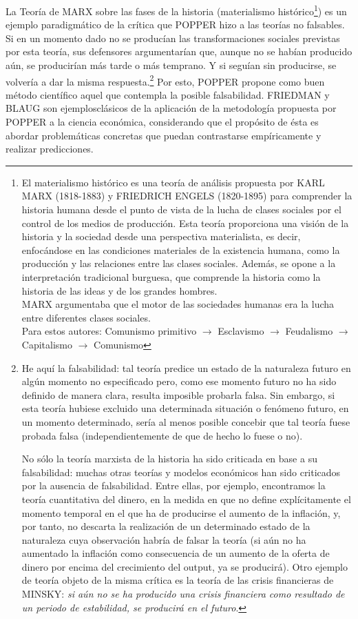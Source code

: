 \documentclass[10pt,a4paper]{article}
\begin{document}
La Teoría de MARX sobre las fases de la historia (materialismo histórico\footnote{%
    El materialismo histórico es una teoría de análisis propuesta por KARL MARX (1818-1883) y FRIEDRICH ENGELS (1820-1895) para comprender la historia humana desde el punto de vista de la lucha de clases sociales por el control de los medios de producción. Esta teoría proporciona una visión de la historia y la sociedad desde una perspectiva materialista, es decir, enfocándose en las condiciones materiales de la existencia humana, como la producción y las relaciones entre las clases sociales. Además, se opone a la interpretación tradicional burguesa, que comprende la historia como la historia de las ideas y de los grandes hombres.\\
MARX argumentaba que el motor de las sociedades humanas era la lucha entre diferentes clases sociales.\\
Para estos autores: Comunismo primitivo $\to$ Esclavismo $\to$ Feudalismo $\to$ Capitalismo $\to$ Comunismo
}) es un ejemplo paradigmático de la crítica que POPPER hizo a las teorías no falsables. Si en un momento dado no se producían las transformaciones sociales previstas por esta teoría, sus defensores argumentarían que, aunque no se habían producido aún, se producirían más tarde o más temprano. Y si seguían sin producirse, se volvería a dar la misma respuesta.\footnote{%
    He aquí la falsabilidad: tal teoría predice un estado de la naturaleza futuro en algún momento no especificado pero, como ese momento futuro no ha sido definido de manera clara, resulta imposible probarla falsa. Sin embargo, si esta teoría hubiese excluido una determinada situación o fenómeno futuro, en un momento determinado, sería al menos posible concebir que tal teoría fuese probada falsa (independientemente de que de hecho lo fuese o no).

No sólo la teoría marxista de la historia ha sido criticada en base a su falsabilidad: muchas otras teorías y modelos económicos han sido criticados por la ausencia de falsabilidad. Entre ellas, por ejemplo, encontramos la teoría cuantitativa del dinero, en la medida en que no define explícitamente el momento temporal en el que ha de producirse el aumento de la inflación, y, por tanto, no descarta la realización de un determinado estado de la naturaleza cuya observación habría de falsar la teoría (si aún no ha aumentado la inflación como consecuencia de un aumento de la oferta de dinero por encima del crecimiento del output, ya se producirá). Otro ejemplo de teoría objeto de la misma crítica es la teoría de las crisis financieras de MINSKY: \textit{si aún no se ha producido una crisis financiera como resultado de un periodo de estabilidad, se producirá en el futuro}.
} Por esto, POPPER propone como buen método científico aquel que contempla la posible falsabilidad. FRIEDMAN y BLAUG son ejemplosclásicos de la aplicación de la metodología propuesta por POPPER a la ciencia económica, considerando que el propósito de ésta es abordar problemáticas concretas que puedan contrastarse empíricamente y realizar predicciones.
\end{document}
